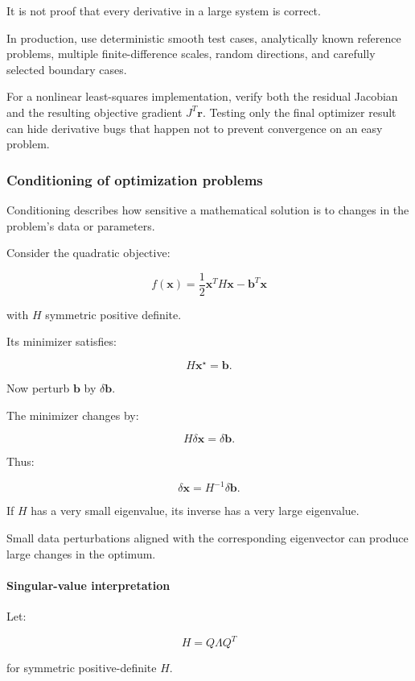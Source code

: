 It is not proof that every derivative in a large system is correct.

In production, use deterministic smooth test cases, analytically known reference problems, multiple finite-difference scales, random directions, and carefully selected boundary cases.

For a nonlinear least-squares implementation, verify both the residual Jacobian and the resulting objective gradient \(J^T\mathbf r\). Testing only the final optimizer result can hide derivative bugs that happen not to prevent convergence on an easy problem.

\subsubsection{Conditioning of optimization problems}\label{02-foundations-ii-ch027-conditioning-of-optimization-problems}

Conditioning describes how sensitive a mathematical solution is to changes in the problem's data or parameters.

Consider the quadratic objective:

\[
f(\mathbf x)= \frac12\mathbf x^TH\mathbf x-\mathbf b^T\mathbf x
\]

with \(H\) symmetric positive definite.

Its minimizer satisfies:

\[
H\mathbf x^\star=\mathbf b.
\]

Now perturb \(\mathbf b\) by \(\delta\mathbf b\).

The minimizer changes by:

\[
H\delta\mathbf x=\delta\mathbf b.
\]

Thus:

\[
\boxed{ \delta\mathbf x=H^{-1}\delta\mathbf b }.
\]

If \(H\) has a very small eigenvalue, its inverse has a very large eigenvalue.

Small data perturbations aligned with the corresponding eigenvector can produce large changes in the optimum.

\paragraph{Singular-value interpretation}\label{02-foundations-ii-ch027-singular-value-interpretation}

Let:

\[
H=Q\Lambda Q^T
\]

for symmetric positive-definite \(H\).

